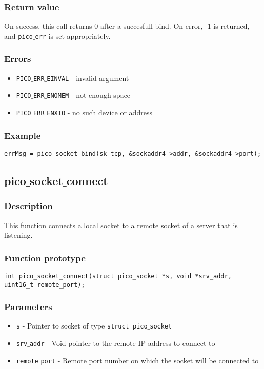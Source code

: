 \subsubsection*{Return value}
On success, this call returns 0 after a succesfull bind.
On error, -1 is returned, and \texttt{pico$\_$err} is set appropriately.

\subsubsection*{Errors}
\begin{itemize}[noitemsep]
\item \texttt{PICO$\_$ERR$\_$EINVAL} - invalid argument
\item \texttt{PICO$\_$ERR$\_$ENOMEM} - not enough space
\item \texttt{PICO$\_$ERR$\_$ENXIO} - no such device or address
\end{itemize}

\subsubsection*{Example}
\begin{verbatim}
errMsg = pico_socket_bind(sk_tcp, &sockaddr4->addr, &sockaddr4->port);
\end{verbatim}


\subsection{pico$\_$socket$\_$connect}

\subsubsection*{Description}
This function connects a local socket to a remote socket of a server that is listening.

\subsubsection*{Function prototype}
\begin{verbatim}
int pico_socket_connect(struct pico_socket *s, void *srv_addr,
uint16_t remote_port);
\end{verbatim}


\subsubsection*{Parameters}
\begin{itemize}[noitemsep]
\item \texttt{s} - Pointer to socket of type \texttt{struct pico$\_$socket}
\item \texttt{srv$\_$addr} - Void pointer to the remote IP-address to connect to
\item \texttt{remote$\_$port} - Remote port number on which the socket will be connected to
\end{itemize} 

